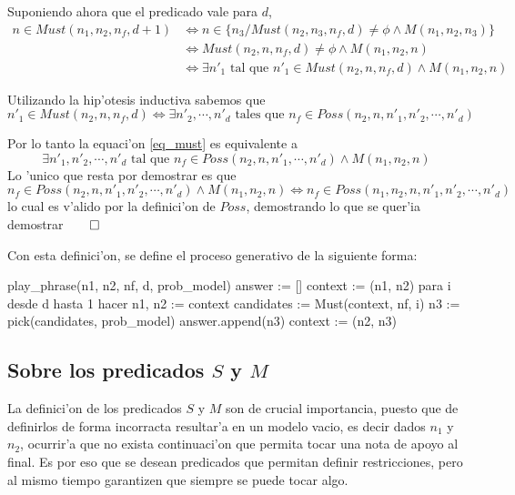 Suponiendo ahora que el predicado vale para $d$, 
\begin{align}
n \in Must(n_1, n_2, n_f, d+1)   & \Leftrightarrow n \in \{n_3/ Must(n_2, n_3, n_f, d) \neq \phi \land M(n_1,n_2, n_3)\} \\
                                 & \Leftrightarrow Must(n_2, n, n_f, d) \neq \phi \land M(n_1,n_2, n) \\
                                 & \Leftrightarrow \exists n'_1 \text{ tal que } n'_1 \in Must(n_2, n, n_f, d) \land M(n_1,n_2, n) \label{eq_must}
\end{align}

Utilizando la hip'otesis inductiva sabemos que 
$$  n'_1 \in Must(n_2, n, n_f, d) \Leftrightarrow \exists n'_2, \cdots, n'_{d} \text{ tales que } n_f \in Poss(n_2, n, n'_1, n'_2, \cdots, n'_{d})$$

Por lo tanto la equaci'on \ref{eq_must} es equivalente a
$$ \exists n'_1, n'_2, \cdots, n'_d \text{ tal que } n_f \in Poss(n_2, n, n'_1, \cdots, n'_d) \land M(n_1,n_2, n) $$
Lo 'unico que resta por demostrar es que 
$$ n_f \in Poss(n_2, n, n'_1, n'_2, \cdots, n'_d) \land M(n_1,n_2, n) \Leftrightarrow n_f \in Poss(n_1, n_2, n, n'_1, n'_2, \cdots, n'_d)$$
lo cual es v'alido por la definici'on de $Poss$, demostrando lo que se quer'ia demostrar$\qed$


Con esta definici'on, se define el proceso generativo de la siguiente forma:

\begin{algoritmo}
play_phrase(n1, n2, nf, d, prob_model)
    answer := []
    context := (n1, n2)
    para i desde d hasta 1 hacer
        n1, n2 := context
        candidates := Must(context, nf, i)
        n3 := pick(candidates, prob_model)
        answer.append(n3)
        context := (n2, n3) 
\end{algoritmo}





\subsection{Sobre los predicados $S$ y $M$}
La definici'on de los predicados $S$ y $M$ son de crucial importancia, puesto que de definirlos de forma incorracta resultar'a en un modelo vacio, 
es decir dados $n_1$ y $n_2$, ocurrir'a que no exista continuaci'on que permita tocar una nota de apoyo al final. 
Es por eso que se desean predicados que permitan definir restricciones, pero al mismo tiempo garantizen que siempre se puede tocar algo.

